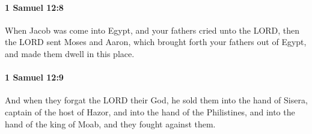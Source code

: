 		\paragraph{1 Samuel 12:8} %
			\label{1SAMUEL-12-8}

			When Jacob was come into Egypt, and your fathers cried unto the LORD, then the LORD sent Moses and Aaron, which brought forth your fathers out of Egypt, and made them dwell in this place.


		\paragraph{1 Samuel 12:9} %
			\label{1SAMUEL-12-9}

			And when they forgat the LORD their God, he sold them into the hand of Sisera, captain of the host of Hazor, and into the hand of the Philistines, and into the hand of the king of Moab, and they fought against them.

